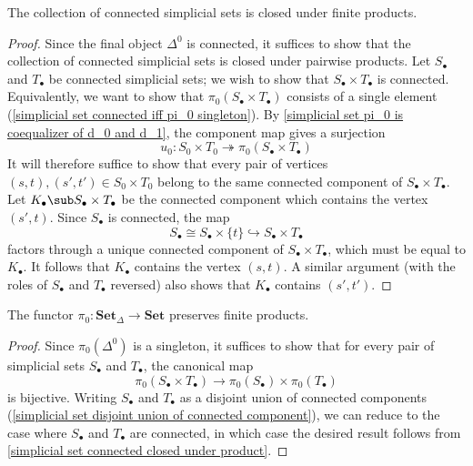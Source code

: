 \begin{proposition}\label{simplicial set connected closed under product}
The collection of connected simplicial sets is closed under finite products.
\end{proposition}
\begin{proof}
Since the final object $\Delta^0$ is connected, it suffices to show that the collection of connected simplicial sets is closed under pairwise products. Let $S_\bullet$ and $T_\bullet$ be connected simplicial sets; we wish to show that $S_\bullet\times T_\bullet$ is connected. Equivalently, we want to show that $\pi_0(S_\bullet\times T_\bullet)$ consists of a single element (\cref{simplicial set connected iff pi_0 singleton}). By \cref{simplicial set pi_0 is coequalizer of d_0 and d_1}, the component map gives a surjection
\[u_0:S_0\times T_0\twoheadrightarrow \pi_0(S_\bullet\times T_\bullet)\]
It will therefore suffice to show that every pair of vertices $(s,t),(s',t')\in S_0\times T_0$ belong to the same connected component of $S_\bullet\times T_\bullet$. Let $K_\bullet\sub S_\bullet\times T_\bullet$ be the connected component which contains the vertex $(s',t)$. Since $S_\bullet$ is connected, the map
\[S_\bullet\cong S_\bullet\times\{t\}\hookrightarrow S_\bullet\times T_\bullet\]
factors through a unique connected component of $S_\bullet\times T_\bullet$, which must be equal to $K_\bullet$. It follows that $K_\bullet$ contains the vertex $(s,t)$. A similar argument (with the roles of $S_\bullet$ and $T_\bullet$ reversed) also shows that $K_\bullet$ contains $(s',t')$.
\end{proof}
\begin{corollary}\label{simplicial set pi_0 preserves finite product}
The functor $\pi_0:\mathbf{Set}_\Delta\to\mathbf{Set}$ preserves finite products.
\end{corollary}
\begin{proof}
Since $\pi_0(\Delta^0)$ is a singleton, it suffices to show that for every pair of simplicial sets $S_\bullet$ and $T_\bullet$, the canonical map
\[\pi_0(S_\bullet\times T_\bullet)\to\pi_0(S_\bullet)\times \pi_0(T_\bullet)\]
is bijective. Writing $S_\bullet$ and $T_\bullet$ as a disjoint union of connected components (\cref{simplicial set disjoint union of connected component}), we can reduce to the case where $S_\bullet$ and $T_\bullet$ are connected, in which case the desired result follows from \cref{simplicial set connected closed under product}.
\end{proof}
